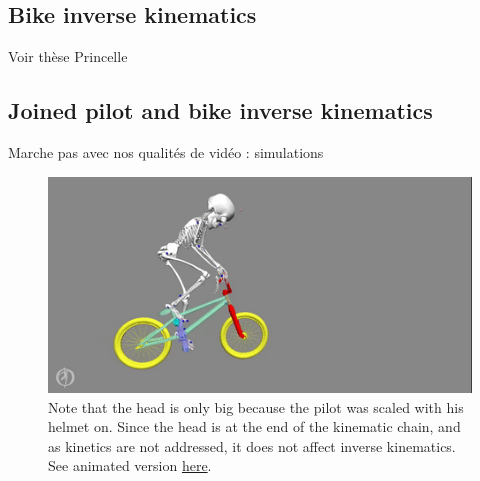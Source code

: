 \subsection{Bike inverse kinematics}



Voir thèse Princelle


\subsection{Joined pilot and bike inverse kinematics}
Marche pas avec nos qualités de vidéo : simulations



\begin{figure}[hbtp]
	\centering
	\def\svgwidth{1\columnwidth}
	\fontsize{10pt}{10pt}\selectfont
	\includegraphics[width=\linewidth]{"../Chap7/Figures/BMXPilot.png"}
	\caption{Note that the head is only big because the pilot was scaled with his helmet on. Since the head is at the end of the kinematic chain, and as kinetics are not addressed, it does not affect inverse kinematics. See animated version \href{https://github.com/perfanalytics/pose2sim/blob/main/Content/Activities_verylow.gif}{here}.}
	\label{fig_bmxpilot}
\end{figure}




